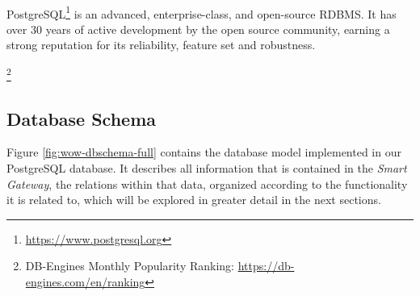 
\paragraph{} PostgreSQL\footnote{\url{https://www.postgresql.org}} is an advanced, enterprise-class, and open-source \acs{RDBMS}. It has over 30 years of active development by the open source community, earning a strong reputation for its reliability, feature set and robustness.

\footnote{DB-Engines Monthly Popularity Ranking: \url{https://db-engines.com/en/ranking}}




\subsection{Database Schema}
Figure \ref{fig:wow-dbschema-full} contains the database model implemented in our PostgreSQL database. It describes all information that is contained in the \textit{Smart Gateway}, the relations within that data, organized according to the functionality it is related to, which will be explored in greater detail in the next sections.

